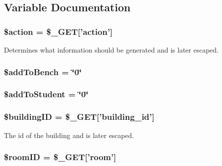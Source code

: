 \subsection{\-Variable \-Documentation}
\hypertarget{checkRooms_8php_aa698a3e72116e8e778be0e95d908ee30}{
\subsubsection[{\$action}]{\setlength{\rightskip}{0pt plus 5cm}\$action = \$\-\_\-\-G\-E\-T\mbox{[}'action'\mbox{]}}}\label{checkRooms_8php_aa698a3e72116e8e778be0e95d908ee30}
\-Determines what information should be generated and is later escaped. \hypertarget{checkRooms_8php_a203f48bd509ef90819599e761f574023}{
\subsubsection[{\$add\-To\-Bench}]{\setlength{\rightskip}{0pt plus 5cm}\$add\-To\-Bench = \char`\"{}0\char`\"{}}}\label{checkRooms_8php_a203f48bd509ef90819599e761f574023}
\hypertarget{checkRooms_8php_ab8b532875ded9bdf4075f627ddf2fa78}{
\subsubsection[{\$add\-To\-Student}]{\setlength{\rightskip}{0pt plus 5cm}\$add\-To\-Student = \char`\"{}0\char`\"{}}}\label{checkRooms_8php_ab8b532875ded9bdf4075f627ddf2fa78}
\hypertarget{checkRooms_8php_acfaa0ff73c631ce07c4851ed12fcd83d}{
\subsubsection[{\$building\-I\-D}]{\setlength{\rightskip}{0pt plus 5cm}\$building\-I\-D = \$\-\_\-\-G\-E\-T\mbox{[}'building\-\_\-id'\mbox{]}}}\label{checkRooms_8php_acfaa0ff73c631ce07c4851ed12fcd83d}
\-The id of the building and is later escaped. \hypertarget{checkRooms_8php_a61034568ba6e795a925d00afa98d3797}{
\subsubsection[{\$room\-I\-D}]{\setlength{\rightskip}{0pt plus 5cm}\$room\-I\-D = \$\-\_\-\-G\-E\-T\mbox{[}'room'\mbox{]}}}\label{checkRooms_8php_a61034568ba6e795a925d00afa98d3797}
